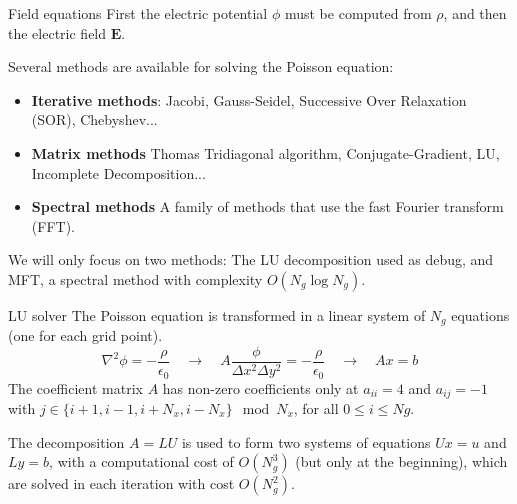 \documentclass{beamer}
\newcommand*\V[1]{\bm{#1}}
\newcommand{\E}{\V{E}}
\begin{document}
\begin{frame}{Field equations}{}
First the electric potential $\phi$ must be computed from $\rho$, and then the 
electric field $\E$.

\vspace{1em}
Several methods are available for solving the Poisson equation:

\begin{itemize}
\setlength\itemsep{1em}
\item \textbf{Iterative  methods}: Jacobi, Gauss-Seidel, Successive Over 
Relaxation (SOR), Chebyshev...
\item \textbf{Matrix methods} Thomas Tridiagonal algorithm, Conjugate-Gradient, 
LU, Incomplete Decomposition...
\item \textbf{Spectral methods} A family of methods that use the fast Fourier 
transform (FFT).
\end{itemize}

\vspace{1em}
We will only focus on two methods: The LU decomposition used as debug, and MFT, 
a spectral method with complexity $O(N_g \log N_g)$.
\end{frame}

\begin{frame}{LU solver}
The Poisson equation is transformed in a linear system of $N_g$ equations (one 
for each grid point).
\begin{equation}
\label{eq:eq-system}
\nabla^2 \phi = - \frac{\rho}{\epsilon_0}
\quad \rightarrow \quad
A\frac{\phi}{\Delta x ^2 \Delta y^2} = -\frac{\rho}{\epsilon_0}
\quad \rightarrow \quad
Ax = b
\end{equation}
The coefficient matrix $A$ has non-zero coefficients only at $a_{ii} = 4$ and 
$a_{ij} = -1$ with $j \in \{i+1, i-1, i+N_x, i-N_x\} \mod N_x$, for all $0 \le i 
\le Ng$.

\vspace{1em}
The decomposition $A = LU$ is used to form two systems of equations $Ux = u$ and 
$Ly=b$, with a computational cost of $O(N_g^3)$ (but only at the beginning), 
which are solved in each iteration with cost $O(N_g^2)$.
\end{frame}
\end{document}
